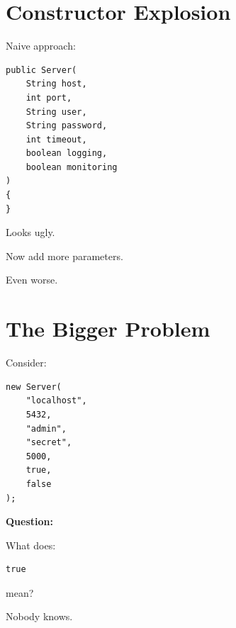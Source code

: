 \documentclass[11pt,a4paper]{book}
\begin{document}
\section{Constructor Explosion}

Naive approach:

\begin{verbatim}
public Server(
    String host,
    int port,
    String user,
    String password,
    int timeout,
    boolean logging,
    boolean monitoring
)
{
}
\end{verbatim}


Looks ugly.


Now add more parameters.


Even worse.


\section{The Bigger Problem}

Consider:

\begin{verbatim}
new Server(
    "localhost",
    5432,
    "admin",
    "secret",
    5000,
    true,
    false
);
\end{verbatim}


\textbf{Question:}


What does:

\begin{verbatim}
true
\end{verbatim}

mean?


Nobody knows.
\end{document}
